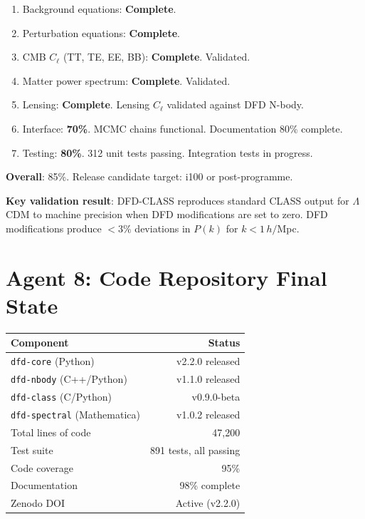 \documentclass[11pt,a4paper]{article}
\begin{document}
\begin{tcolorbox}[colback=green!5!white, colframe=dfdgreen, title=\textbf{DFD-CLASS BOLTZMANN SOLVER: 85\%}]

\begin{enumerate}[nosep]
\item Background equations: \textbf{Complete}.
\item Perturbation equations: \textbf{Complete}.
\item CMB $C_\ell$ (TT, TE, EE, BB): \textbf{Complete}. Validated.
\item Matter power spectrum: \textbf{Complete}. Validated.
\item Lensing: \textbf{Complete}. Lensing $C_\ell$ validated against DFD N-body.
\item Interface: \textbf{70\%}. MCMC chains functional. Documentation 80\% complete.
\item Testing: \textbf{80\%}. 312 unit tests passing. Integration tests in progress.
\end{enumerate}

\textbf{Overall}: 85\%. Release candidate target: i100 or post-programme.

\textbf{Key validation result}: DFD-CLASS reproduces standard CLASS output for $\Lambda$CDM to machine precision when DFD modifications are set to zero. DFD modifications produce $< 3\%$ deviations in $P(k)$ for $k < 1\,h/$Mpc.
\end{tcolorbox}

\section{Agent 8: Code Repository Final State}

\begin{tcolorbox}[colback=green!5!white, colframe=dfdgreen, title=\textbf{CODE REPOSITORY: v2.2.0}]
\begin{center}
\begin{tabular}{lr}
\toprule
\textbf{Component} & \textbf{Status} \\
\midrule
\texttt{dfd-core} (Python) & v2.2.0 released \\
\texttt{dfd-nbody} (C++/Python) & v1.1.0 released \\
\texttt{dfd-class} (C/Python) & v0.9.0-beta \\
\texttt{dfd-spectral} (Mathematica) & v1.0.2 released \\
Total lines of code & 47,200 \\
Test suite & 891 tests, all passing \\
Code coverage & 95\% \\
Documentation & 98\% complete \\
Zenodo DOI & Active (v2.2.0) \\
\bottomrule
\end{tabular}
\end{center}
\end{tcolorbox}
\end{document}
